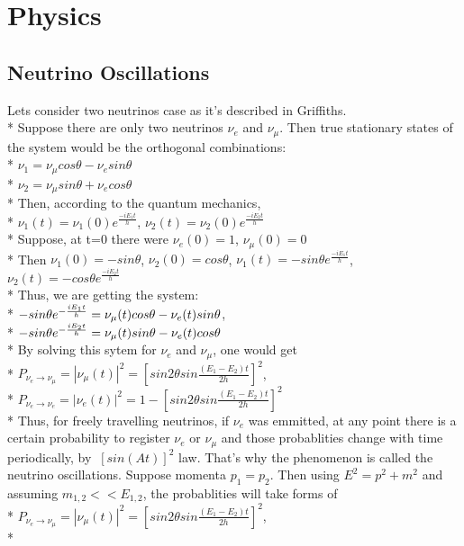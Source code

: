 \section{Physics}
\subsection{Neutrino Oscillations}
Lets consider two neutrinos case as it's described in Griffiths\cite{ref_Griffiths}.\\*
Suppose there are only two neutrinos $\nu_e$ and $\nu_{\mu}$. Then true stationary states of the system would be the orthogonal combinations:\\*
$\nu_1=\nu_{\mu}cos\theta-\nu_esin\theta$\\*
$\nu_2=\nu_{\mu}sin\theta+\nu_ecos\theta$\\*
Then, according to the quantum mechanics,\\*
$\nu_1(t)=\nu_1(0)e^{\frac{-iE_1t}{h}}$, $\nu_2(t)=\nu_2(0)e^{\frac{-iE_2t}{h}}$\\*
Suppose, at t=0 there were $\nu_e(0)=1$, $\nu_\mu(0)=0$\\*
Then $\nu_1(0)=-sin\theta$, $\nu_2(0)=cos\theta$, $\nu_1(t)=-{sin\theta}e^{\frac{-iE_1t}{h}}$, $\nu_2(t)=-{cos\theta}e^{\frac{-iE_2t}{h}}$\\*
Thus, we are getting the system:\\*
$-{sin\theta}e^{-{{iE_1t} \over h}}=\nu_\mu(t)cos\theta-\nu_e(t)sin\theta$,\\*
$-{sin\theta}e^{-{{iE_2t} \over h}}=\nu_\mu(t)sin\theta-\nu_e(t)cos\theta$\\*
By solving this sytem for $\nu_e$ and $\nu_\mu$, one would get\\*
$P_{\nu_e \rightarrow \nu_\mu}=|\nu_\mu(t)|^2=[{sin2\theta}sin{\frac{(E_1-E_2)t}{2h}}]^2$,\\*
$P_{\nu_e \rightarrow \nu_e}=|\nu_e(t)|^2=1-[{sin2\theta}sin{\frac{(E_1-E_2)t}{2h}}]^2$\\*
Thus, for freely travelling neutrinos, if $\nu_e$ was emmitted, at any point there is a certain probability to register $\nu_e$ or $\nu_\mu$ and those probablities change with time periodically, by $~[sin(At)]^2$ law. That's why the phenomenon is called the neutrino oscillations.
Suppose momenta $p_1=p_2$. Then using $E^2=p^2+m^2$ and assuming $m_{1,2}<<E_{1,2}$, the probablities will take forms of\\*
$P_{\nu_e \rightarrow \nu_\mu}=|\nu_\mu(t)|^2=[{sin2\theta}sin{\frac{(E_1-E_2)t}{2h}}]^2$,\\*  

